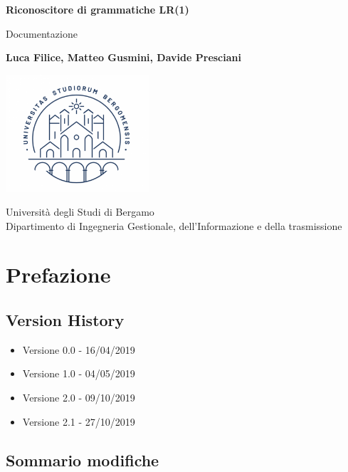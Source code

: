 \documentclass[12pt]{article}
\begin{document}
\begin{titlepage}
   \begin{center}
       \vspace*{4cm}
 
       \textbf{\Huge{Riconoscitore di grammatiche LR(1)}}
 
       \vspace{0.5cm}
        \large{Documentazione}
 
       \vspace{2cm}
 
       \textbf{Luca Filice, Matteo Gusmini, Davide Presciani}
 
       \vfill
 
       \includegraphics[width=0.4\textwidth]{immagini/logo}
 
       Università degli Studi di Bergamo\\
       Dipartimento di Ingegneria Gestionale, dell'Informazione e della trasmissione\\
 
   \end{center}
\end{titlepage}
\tableofcontents

\pagebreak

\section{Prefazione}

\subsection{Version History}
\begin{itemize}
\item Versione 0.0 - 16/04/2019
\item Versione 1.0 - 04/05/2019
\item Versione 2.0 - 09/10/2019
\item Versione 2.1 - 27/10/2019
\end{itemize}


\subsection{Sommario modifiche}
\end{document}
